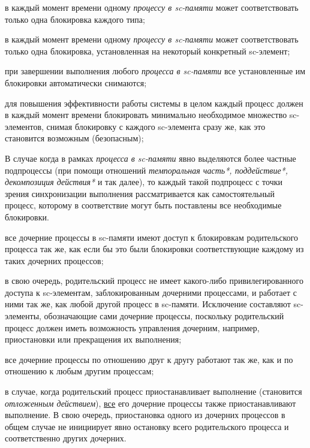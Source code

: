 \begin{textitemize}
	\item в каждый момент времени одному \textit{процессу в sc-памяти} может соответствовать только одна блокировка каждого типа;
	\item в каждый момент времени одному \textit{процессу в sc-памяти} может соответствовать только одна блокировка, установленная на некоторый конкретный sc-элемент;
	\item при завершении выполнения любого \textit{процесса в sc-памяти} все установленные им блокировки автоматически снимаются;
	\item для повышения эффективности работы системы в целом каждый процесс должен в каждый момент времени блокировать минимально необходимое множество sc-элементов, снимая блокировку с каждого sc-элемента сразу же, как это становится возможным (безопасным);
	\item В случае когда в рамках \textit{процесса в sc-памяти} явно выделяются более частные подпроцессы (при помощи отношений \textit{темпоральная часть*, поддействие*, декомпозиция действия*} и так далее), то каждый такой подпроцесс с точки зрения синхронизации выполнения рассматривается как самостоятельный процесс, которому в соответствие могут быть поставлены все необходимые блокировки.
	\begin{textitemize}
		\item все дочерние процессы в sc-памяти имеют доступ к блокировкам родительского процесса так же, как если бы это были блокировки соответствующие каждому из таких дочерних процессов;
		\item в свою очередь, родительский процесс не имеет какого-либо привилегированного доступа к sc-элементам, заблокированным дочерними процессами, и работает с ними так же, как любой другой процесс в sc-памяти. Исключение составляют sc-элементы, обозначающие сами дочерние процессы, поскольку родительский процесс должен иметь возможность управления дочерним, например, приостановки или прекращения их выполнения;
		\item все дочерние процессы по отношению друг к другу работают так же, как и по отношению к любым другим процессам;
		\item в случае, когда родительский процесс приостанавливает выполнение (становится \textit{отложенным действием}), \uline{все} его дочерние процессы также приостанавливают выполнение. В свою очередь, приостановка одного из дочерних процессов в общем случае не инициирует явно остановку всего родительского процесса и соответственно других дочерних.
		\end{textitemize}
\end{textitemize}

